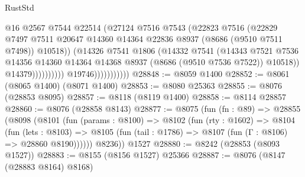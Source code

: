 \begin{lexlean}{RustStd}
\begin{coremodule}
                                          @16
                                          @2567
                                          @7544
                                          @22514
                                          (@27124
                                            @7516
                                            @7543
                                            (@22823
                                              @7516
                                              (@22829
                                                @7497
                                                @7511
                                                @20647
                                                @14360
                                                @14364
                                                @22836
                                                @8937
                                                (@8686 (@9510 @7511 @7498))
                                                @10518))
                                            (@14326
                                              @7541
                                              @1806
                                              (@14332
                                                @7541
                                                (@14343
                                                  @7521
                                                  @7536
                                                  @14356
                                                  @14360
                                                  @14364
                                                  @14368
                                                  @8937
                                                  (@8686 (@9510 @7536 @7522))
                                                  @10518))
                                              @14379))))))))))
                          @19746)))))))))))
@28848 := @8059 @1400
@28852 := @8061 (@8065 @1400) (@8071 @1400)
@28853 := @8080 @25363
@28855 := @8076 (@28853 @8095)
@28857 := @8118 (@8119 @1400)
@28858 := @8114 @28857
@28860 := @8076 (@28858 @8143)
@28877 := @8075
    (fun (fn : @89) =>
    @28855
      (@8098
        (@8101
          (fun (params : @8100) =>
          @8102
            (fun (rty : @1602) =>
            @8104
              (fun (lets : @8103) =>
              @8105 (fun (tail : @1786) => @8107 (fun (Γ : @8106) => @28860 @8190))))))
        @8236))
    @1527
@28880 := @8242 (@28853 (@8093 @1527))
@28883 := @8155 (@8156 @1527) @25366
@28887 := @8076 (@8147 (@28883 @8164) @8168)

\end{coremodule}
\end{lexlean}
